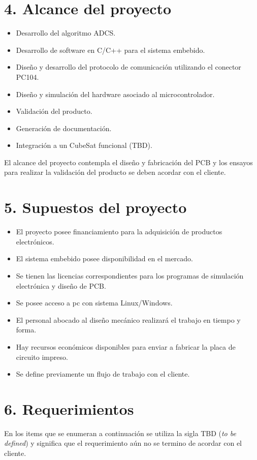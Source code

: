\documentclass[
11pt, %
]{charter}
\begin{document}
\section{4. Alcance del proyecto}
\label{sec:alcance}
\begin{itemize}
	\item Desarrollo del algoritmo ADCS. 
	\item Desarrollo de software en C/C++ para el sistema embebido. 
	\item Diseño y desarrollo del protocolo de comunicación utilizando el conector PC104.
	\item Diseño y simulación del hardware asociado al microcontrolador. 
	\item Validación del producto.
	\item Generación de documentación.  
	\item Integración a un CubeSat funcional (TBD).
\end{itemize}
	
	El alcance del proyecto contempla el diseño y fabricación del PCB y	los ensayos para realizar la validación del producto se deben acordar con el cliente.  
	
\section{5. Supuestos del proyecto}
\label{sec:supuestos}
\begin{itemize}
	\item El proyecto posee financiamiento para la adquisición de productos electrónicos.   
	\item El sistema embebido posee disponibilidad en el mercado. 
	\item Se tienen las licencias correspondientes para los programas de simulación electrónica y diseño de PCB.  
	\item Se posee acceso a pc con sistema Linux/Windows. 
	\item El personal abocado al diseño mecánico realizará el trabajo en tiempo y forma.  
	\item Hay recursos económicos disponibles para enviar a fabricar la placa de circuito impreso. 
	\item Se define previamente un flujo de trabajo con el cliente. 
\end{itemize}

\section{6. Requerimientos}
\label{sec:requerimientos}
	En los items que se enumeran a continuación se utiliza la sigla TBD (\textit{to be defined}) 
	y significa que el requerimiento aún no se termino de acordar con el cliente. 
\end{document}
